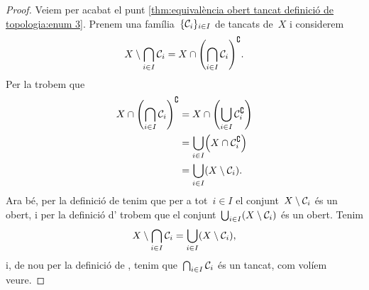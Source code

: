 \documentclass[../../main.tex]{subfiles}
\begin{document}
\begin{proof}
        Veiem per acabat el punt \eqref{thm:equivalència obert tancat definició de topologia:enum 3}.
        Prenem una família~\(\{\mathcal{C}_{i}\}_{i\in I}\) de tancats de~\(X\) i considerem
        \[
            X\setminus\bigcap_{i\in I}\tancat{C}_{i}=X\cap\left(\bigcap_{i\in I}\tancat{C}_{i}\right)^{\complement}.
        \]
        Per la  trobem que
        \begin{align*}
            X\cap\left(\bigcap_{i\in I}\tancat{C}_{i}\right)^{\complement}&=X\cap\left(\bigcup_{i\in I}\tancat{C}_{i}^{\complement}\right) \\
            &=\bigcup_{i\in I}\left(X\cap\tancat{C}_{i}^{\complement}\right) \\
            &=\bigcup_{i\in I}\left(X\setminus\tancat{C}_{i}\right).
        \end{align*}
        Ara bé, per la definició de  tenim que per a tot~\(i\in I\) el conjunt~\(X\setminus\mathcal{C}_{i}\) és un obert, i per la definició d' trobem que el conjunt~\(\bigcup_{i\in I}\left(X\setminus\tancat{C}_{i}\right)\) és un obert.
        Tenim
        \[
            X\setminus\bigcap_{i\in I}\tancat{C}_{i}=\bigcup_{i\in I}\left(X\setminus\tancat{C}_{i}\right),
        \]
        i, de nou per la definició de , tenim que~\(\bigcap_{i\in I}\mathcal{C}_{i}\) és un tancat, com volíem veure.
    \end{proof}
\end{document}

